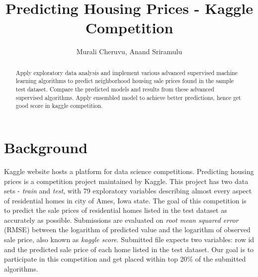 \documentclass[sigconf]{acmart}
\begin{document}
		
	\title{Predicting Housing Prices - Kaggle Competition}	
	
	\author{Murali Cheruvu, Anand Sriramulu}
	
	\renewcommand{\shortauthors}{M. Cheruvu, A Sriramulu}
	
	
	\begin{abstract}
		
	Apply exploratory data analysis and implement various advanced supervised machine learning algorithms to predict neighborhood housing sale prices found in the sample test dataset. Compare the predicted models and results from these advanced supervised algorithms. Apply ensembled model to achieve better predictions, hence get good score in kaggle competition.
	
	\end{abstract}
	
	
	\maketitle
	
	\section{Background}
	
	Kaggle website hosts a platform for data science competitions. Predicting housing prices is a competition project maintained by Kaggle. This project has two data sets - {\em train} and {\em test}, with 79 exploratory variables describing almost every aspect of residential homes in city of Ames, Iowa state. The goal of this competition is to predict the sale prices of residential homes listed in the test dataset as accurately as possible. Submissions are evaluated on {\em root mean squared error} (RMSE) between the logarithm of predicted value and the logarithm of observed sale price, also known as {\em kaggle score}. Submitted file expects two variables: row id and the predicted sale price of each home listed in the test dataset. Our goal is to participate in this competition and get placed within top 20\% of the submitted algorithms.
	
\end{document}

